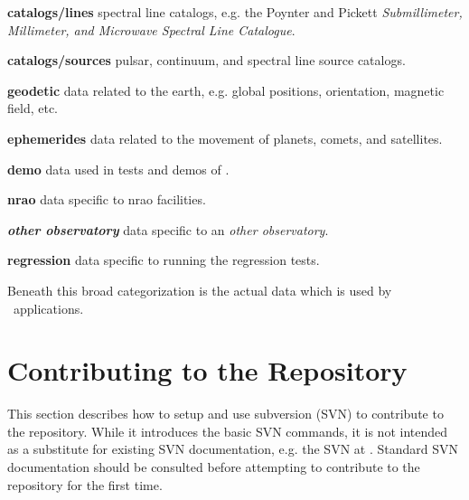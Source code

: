 \begin{list}{}{\setlength{\rightmargin}{\leftmargin}}

\item{\textbf{catalogs/lines}} spectral line catalogs, e.g. the Poynter and Pickett \textit{Submillimeter, Millimeter, and Microwave Spectral Line Catalogue}.

\item{\textbf{catalogs/sources}} pulsar, continuum, and spectral line source catalogs.

\item{\textbf{geodetic}} data related to the earth, e.g. global positions, orientation,
magnetic field, etc.

\item{\textbf{ephemerides}} data related to the movement of planets, comets, and satellites.

\item{\textbf{demo}} data used in tests and demos of \aipspp.

\item{\textbf{nrao}} data specific to nrao facilities.

\item{\textbf{\textit{other observatory}}} data specific to an \textit{other observatory}.

\item{\textbf{regression}} data specific to running the regression tests.

\end{list}

\noindent
Beneath this broad categorization is the actual data which is used by
\aipspp\ applications.


\section{Contributing to the Repository}
\label{data repository contributing}

This section describes how to setup and use subversion (SVN) to contribute to the repository.
While it introduces the basic SVN commands, it is not intended as a substitute
for existing SVN documentation, e.g. the SVN
at . Standard SVN documentation should be consulted before
attempting to contribute to the repository for the first time.

